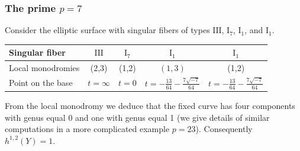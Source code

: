 \documentclass[a4paper]{amsart}
\theoremstyle{plain}
\theoremstyle{definition}
\theoremstyle{remark}
\numberwithin{equation}{section}
\begin{document}
\subsubsection*{The prime $p=7$}
Consider the elliptic surface with singular fibers of types
$\mathrm{III}$, $\mathrm{I}_{7}$, $\mathrm{I}_{1}$, and $\mathrm{I}_{1}$.
\begin{table}[H]
	\centering
	\renewcommand{\arraystretch}{1.2}
	\begin{tabular}{lcccc}
		\toprule
		Singular fiber
		& $\mathrm{III}$
		& $\mathrm{I}_{7}$
		& $\mathrm{I}_{1}$ & $\mathrm{I}_{1}$ \\
				\midrule
		Local monodromies &  (2,3)& (1,2)& $(1,3)$ & (1,2)\\
		\midrule
		Point on the base & $t=\infty$ & $t=0$ & $t=-\frac{13}{64}-\frac{7 \sqrt{-7}}{64}
		$ & $t=-\frac{13}{64}-\frac{7 \sqrt{-7}}{64}$ \\
		\bottomrule
	\end{tabular}
\end{table}
From the local monodromy we deduce that the fixed curve has four components with genus equal 0 and one with genus equal 1 (we give details of similar computations in a more complicated example $p=23$). Consequently $h^{1,2}(Y)=1$.
\end{document}
